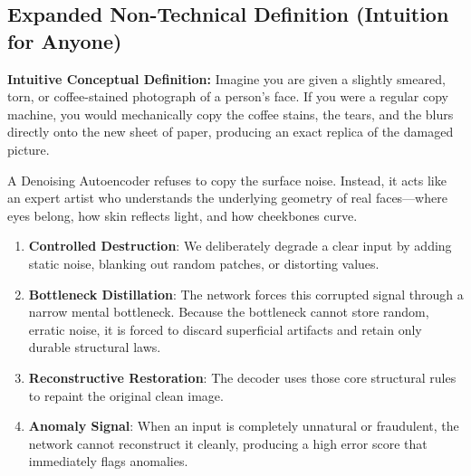 \documentclass[11pt,a4paper]{article}
\theoremstyle{definition}
\begin{document}
\subsection{Expanded Non-Technical Definition (Intuition for Anyone)}
\textbf{Intuitive Conceptual Definition:}
Imagine you are given a slightly smeared, torn, or coffee-stained photograph of a person's face. If you were a regular copy machine, you would mechanically copy the coffee stains, the tears, and the blurs directly onto the new sheet of paper, producing an exact replica of the damaged picture. 

A Denoising Autoencoder refuses to copy the surface noise. Instead, it acts like an expert artist who understands the underlying geometry of real faces—where eyes belong, how skin reflects light, and how cheekbones curve. 
\begin{enumerate}
    \item \textbf{Controlled Destruction}: We deliberately degrade a clear input by adding static noise, blanking out random patches, or distorting values.
    \item \textbf{Bottleneck Distillation}: The network forces this corrupted signal through a narrow mental bottleneck. Because the bottleneck cannot store random, erratic noise, it is forced to discard superficial artifacts and retain only durable structural laws.
    \item \textbf{Reconstructive Restoration}: The decoder uses those core structural rules to repaint the original clean image.
    \item \textbf{Anomaly Signal}: When an input is completely unnatural or fraudulent, the network cannot reconstruct it cleanly, producing a high error score that immediately flags anomalies.
\end{enumerate}
\end{document}

